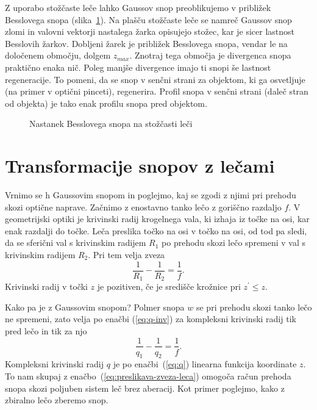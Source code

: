 \begin{remark}
Z uporabo stožčaste leče lahko Gaussov snop
preoblikujemo v približek Besslovega snopa (slika~\ref{fig:Bessel_leca}). 
Na plašču stožčaste leče se namreč Gaussov snop zlomi in valovni vektorji 
nastalega žarka opisujejo stožec, kar je sicer lastnost Besslovih žarkov.
Dobljeni žarek je približek Besslovega snopa, vendar le na določenem območju, dolgem $z_{max}$.
Znotraj tega območja je divergenca snopa praktično enaka nič. Poleg manjše divergence
imajo ti snopi še lastnost regeneracije. To pomeni, da se snop v senčni strani
za objektom, ki ga osvetljuje (na primer v optični pinceti), regenerira. 
Profil snopa v senčni strani (daleč stran od objekta) je tako enak profilu 
snopa pred objektom. 
\begin{figure}[h]
\centering
\def\svgwidth{100truemm} 

\caption{Nastanek Besslovega snopa na stožčasti leči}
\label{fig:Bessel_leca}
\end{figure}
\end{remark}

\section{Transformacije snopov z lečami}

Vrnimo se h Gaussovim snopom in poglejmo, kaj se zgodi z njimi pri prehodu
skozi optične naprave. Začnimo
z enostavno tanko lečo z goriščno razdaljo $f$. V geometrijski optiki
je krivinski radij krogelnega vala, ki izhaja iz točke na osi, kar
enak razdalji do točke. Leča preslika točko na osi v točko na osi,
od tod pa sledi, da se sferični val s krivinskim radijem $R_{1}$
po prehodu skozi lečo spremeni v val s krivinskim radijem $R_{2}$.
Pri tem velja zveza 
\begin{equation}
\frac{1}{R_{1}}-\frac{1}{R_{2}}=\frac{1}{f}.
\end{equation}
Krivinski radij v točki $z$ je pozitiven, če je središče krožnice pri $z^{\prime}\le z$.

Kako pa je z Gaussovim snopom? Polmer snopa $w$ se pri prehodu 
skozi tanko lečo ne spremeni, zato velja po enačbi (\ref{eq:q-inv}) za
kompleksni krivinski radij tik pred lečo in tik za njo
\begin{equation}
\frac{1}{q_{1}}-\frac{1}{q_{2}}=\frac{1}{f}.
\label{eq:preslikava-zveza-leca}
\end{equation}
Kompleksni krivinski radij $q$ je po enačbi~(\ref{eq:q}) linearna funkcija koordinate $z$.
To nam skupaj z enačbo~(\ref{eq:preslikava-zveza-leca})
omogoča račun prehoda snopa skozi poljuben sistem leč brez aberacij.
Kot primer poglejmo, kako z zbiralno lečo zberemo snop.

